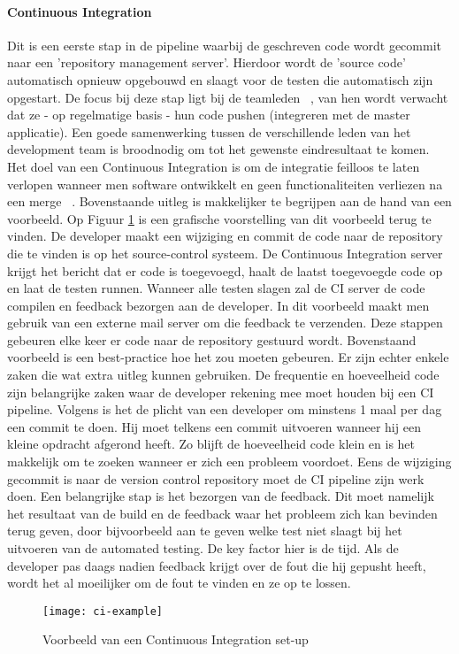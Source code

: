 
    \paragraph{Continuous Integration}
    Dit is een eerste stap in de pipeline waarbij de geschreven code wordt gecommit naar een 'repository management server'. Hierdoor wordt de 'source code' automatisch opnieuw opgebouwd en slaagt voor de testen die automatisch zijn opgestart. De focus bij deze stap ligt bij de teamleden ~\autocite{Fowler2006}, van hen wordt verwacht dat ze - op regelmatige basis - hun code pushen (integreren met de master applicatie). Een goede samenwerking tussen de verschillende leden van het development team is broodnodig om tot het gewenste eindresultaat te komen.
    Het doel van een Continuous Integration is om de integratie feilloos te laten verlopen wanneer men software ontwikkelt en geen functionaliteiten verliezen na een merge ~\autocite{Riti2018}.
    \newline
    Bovenstaande uitleg is makkelijker te begrijpen aan de hand van een voorbeeld. Op Figuur \ref{img-ci-example} is een grafische voorstelling van dit voorbeeld terug te vinden.
    De developer maakt een wijziging en commit de code naar de repository die te vinden is op het source-control systeem. De Continuous Integration server krijgt het bericht dat er code is toegevoegd, haalt de laatst toegevoegde code op en laat de testen runnen. Wanneer alle testen slagen zal de CI server de code compilen en feedback bezorgen aan de developer. In dit voorbeeld maakt men gebruik van een externe mail server om die feedback te verzenden.
    Deze stappen gebeuren elke keer er code naar de repository gestuurd wordt.
    Bovenstaand voorbeeld is een best-practice hoe het zou moeten gebeuren. Er zijn echter enkele zaken die wat extra uitleg kunnen gebruiken.
    De frequentie en hoeveelheid code zijn belangrijke zaken waar de developer rekening mee moet houden bij een CI pipeline. Volgens \textcite{Fowler2006} is het de plicht van een developer om minstens 1 maal per dag een commit te doen. Hij moet telkens een commit uitvoeren wanneer hij een kleine opdracht afgerond heeft. Zo blijft de hoeveelheid code klein en is het makkelijk om te zoeken wanneer er zich een probleem voordoet.
    Eens de wijziging gecommit is naar de version control repository moet de CI pipeline zijn werk doen. Een belangrijke stap is het bezorgen van de feedback. Dit moet namelijk het resultaat van de build en de feedback waar het probleem zich kan bevinden terug geven, door bijvoorbeeld aan te geven welke test niet slaagt bij het uitvoeren van de automated testing. De key factor hier is de tijd. Als de developer pas daags nadien feedback krijgt over de fout die hij gepusht heeft, wordt het al moeilijker om de fout te vinden en ze op te lossen. 
    \begin{figure}	
        \texttt{[image: ci-example]}
        \caption{Voorbeeld van een Continuous Integration set-up ~\autocite{Riti2018}} \label{img-ci-example}
    \end{figure}

